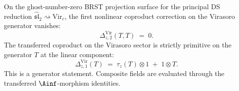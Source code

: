 \begin{proposition}\label{prop:coproduct-degree2-vanishing}
On the ghost-number-zero BRST projection surface for the principal
DS reduction \(\widehat{\mathfrak{sl}}_2\rightsquigarrow\mathrm{Vir}_c\),
the first nonlinear coproduct correction on the Virasoro generator
vanishes:
\begin{equation}\label{eq:coproduct-degree2-vanishing}
\Delta_{z,2}^{\mathrm{Vir}}(T,T) \;=\; 0.
\end{equation}
The transferred coproduct on the Virasoro sector is strictly
primitive on the generator \(T\) at the linear component:
\begin{equation}\label{eq:coproduct-primitive-degree1}
\Delta_{z,1}^{\mathrm{Vir}}(T)
\;=\; \tau_z(T) \otimes 1 \;+\; 1 \otimes T.
\end{equation}
This is a generator statement.  Composite fields are evaluated through
the transferred \(\Ainf\)-morphism identities.
\end{proposition}

